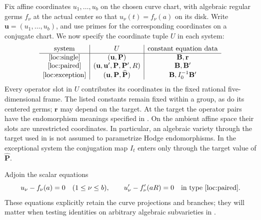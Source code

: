 Fix affine coordinates $u_1,\ldots,u_b$ on the chosen curve chart, with
algebraic regular germs $f_\nu$ at the actual center so that
$u_\nu(t)=f_\nu(a)$ on its disk. Write $\mathbf u=(u_1,\ldots,u_b)$,
and use primes for the corresponding coordinates on a conjugate chart.
We now specify the coordinate tuple $U$ in each system:
\[
\begin{array}{c|c|c}
 \text{system} & U & \text{constant equation data} \\ \hline
 \eqref{loc:single}
   & (\mathbf u,\mathbf P) & \mathbf B,\mathbf r \\
 \eqref{loc:paired}
   & (\mathbf u,\mathbf u',\mathbf P,\mathbf P',R)
   & \mathbf B,\mathbf B' \\
 \eqref{loc:exception}
   & (\mathbf u,\mathbf P,\widehat{\mathbf P})
   & \mathbf B,I_0^{-1}\mathbf B'
\end{array}
\]
Every operator slot in $U$ contributes its coordinates in the fixed
rational five-dimensional frame. The listed constants remain fixed
within a group, as do its centered germs; $\mathbf r$ may depend on the
target. At the target the operator pairs have the endomorphism meanings
specified in . On the ambient affine space their
slots are unrestricted coordinates. In particular, an algebraic variety
through the target used in  is not assumed to parametrize
Hodge endomorphisms. In the exceptional system the conjugation map $I_t$
enters only through the target value of $\widehat{\mathbf P}$.

Adjoin the scalar equations
\begin{equation}\label{loc:base-equations}
 u_\nu-f_\nu(a)=0\quad(1\leq\nu\leq b),
 \qquad
 u_\nu'-f_\nu'(aR)=0\quad\text{in type \eqref{loc:paired}}.
\end{equation}
These equations explicitly retain the curve projections and branches;
they will matter when testing identities on arbitrary algebraic
subvarieties in .


